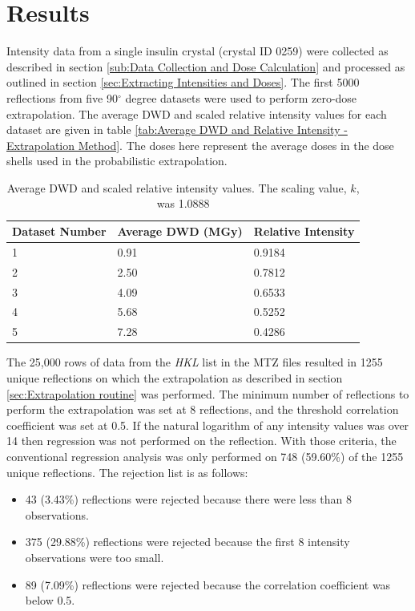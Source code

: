\section{Results}
\label{sec:Results - Zero-dose extrapolation}
Intensity data from a single insulin crystal (crystal ID 0259) were collected as described in section \ref{sub:Data Collection and Dose Calculation} and processed as outlined in section \ref{sec:Extracting Intensities and Doses}.
The first 5000 reflections from five 90$^{\circ}$ degree datasets were used to perform zero-dose extrapolation.
The average DWD and scaled relative intensity values for each dataset are given in table \ref{tab:Average DWD and Relative Intensity - Extrapolation Method}.
The doses here represent the average doses in the dose shells used in the probabilistic extrapolation.
\begin{table}[ht!]
	\caption{Average DWD and scaled relative intensity values. The scaling value, $k$, was 1.0888}
	\centering
	\begin{tabular}{p{3.2cm} | p{3.75cm} | p{3.3cm}}
		Dataset Number    & Average DWD (MGy)     & Relative Intensity \\
		\hline
		1                 & 0.91                  & 0.9184 \\
		2                 & 2.50                  & 0.7812 \\
		3                 & 4.09                  & 0.6533 \\
        4                 & 5.68                  & 0.5252 \\
        5                 & 7.28                  & 0.4286 \\
	\end{tabular}
	\label{tab:Average DWD and Relative Intensity}
\end{table}
The 25,000 rows of data from the \textit{HKL} list in the MTZ files resulted in 1255 unique reflections on which the extrapolation as described in section \ref{sec:Extrapolation routine} was performed.
The minimum number of reflections to perform the extrapolation was set at 8 reflections, and the threshold correlation coefficient was set at 0.5.
If the natural logarithm of any intensity values was over 14 then regression was not performed on the reflection.
With those criteria, the conventional regression analysis was only performed on 748 (59.60\%) of the 1255 unique reflections.
The rejection list is as follows:
\begin{itemize}
    \item 43 (3.43\%) reflections were rejected because there were less than 8 observations.
    \item 375 (29.88\%) reflections were rejected because the first 8 intensity observations were too small.
    \item 89 (7.09\%) reflections were rejected because the correlation coefficient was below 0.5.
\end{itemize}
